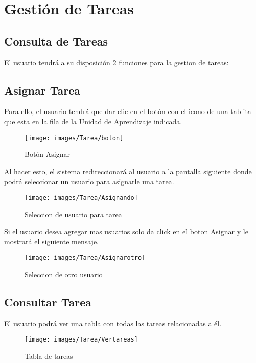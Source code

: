 \section{Gestión de Tareas}
    \subsection{Consulta de Tareas}
        El usuario tendrá a su disposición 2 funciones para la gestion de tareas:

	    \subsection{Asignar Tarea}

        	Para ello, el usuario tendrá que dar clic en el botón con el icono de una tablita que esta en la fila de la Unidad de Aprendizaje indicada.

            \begin{figure}[H]
                \centering
                \hypertarget{boton}{\texttt{[image: images/Tarea/boton]}}
                \caption{Botón Asignar}
                \label{boton}
            \end{figure}

            Al hacer esto, el sistema redireccionará al usuario a la pantalla siguiente donde podrá seleccionar un usuario para asignarle una tarea.
            
            \begin{figure}[H]
                \centering
                \hypertarget{asigna}{\texttt{[image: images/Tarea/Asignando]}}
                \caption{Seleccion de usuario para tarea}
                \label{asigna}
            \end{figure}

            Si el usuario desea agregar mas usuarios solo da click en el boton Asignar y le mostrará el siguiente mensaje.
            \begin{figure}[H]
                \centering
                \hypertarget{asignar}{\texttt{[image: images/Tarea/Asignarotro]}}
                \caption{Seleccion de otro usuario}
                \label{asignar}
            \end{figure}

   
        \subsection{Consultar Tarea}

            El usuario podrá ver una tabla con todas las tareas relacionadas a él.

            \begin{figure}[H]
                \centering
                \hypertarget{asignart}{\texttt{[image: images/Tarea/Vertareas]}}
                \caption{Tabla de tareas}
                \label{asignart}
            \end{figure}

   